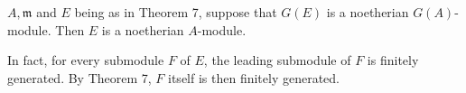 $A, \mathfrak{m}$ and $E$ being as in Theorem 7, suppose that $G(E)$ is a noetherian $G(A)$-module. Then $E$ is a noetherian $A$-module.

In fact, for every submodule $F$ of $E$, the leading submodule of $F$ is finitely generated. By Theorem 7, $F$ itself is then finitely generated.